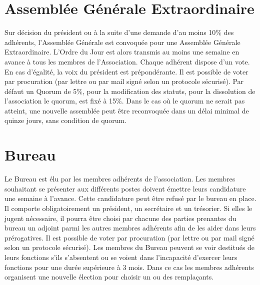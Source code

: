 \documentclass[12pt]{constitution}
\begin{document}
	\section{Assemblée Générale Extraordinaire}
	Sur décision du président ou à la suite d'une demande d'au moins 10\% des adhérents, l'Assemblée Générale est convoquée pour une Assemblée Générale Extraordinaire. L’Ordre du Jour est alors transmis au moins une semaine en avance à tous les membres de l’Association. Chaque adhérent dispose d’un vote. En cas d'égalité, la voix du président est prépondérante. Il est possible de voter par procuration (par lettre ou par mail signé selon un protocole sécurisé). Par défaut un Quorum de 5\%, pour la modification des statuts, pour la dissolution de l'association le quorum, est fixé à 15\%. Dans le cas où le quorum ne serait pas atteint, une nouvelle assemblée peut être reconvoquée dans un délai minimal de quinze jours, sans condition de quorum. 
	
	\section{Bureau}
	
	Le Bureau est élu par les membres adhérents de l'association. Les membres souhaitant se présenter aux différents postes doivent émettre leurs candidature une semaine à l'avance. Cette candidature peut être refusé par le bureau en place. Il comporte obligatoirement un président, un secrétaire et un trésorier. Si elles le jugent nécessaire, il pourra être choisi par chacune des parties prenantes du bureau un adjoint parmi les autres membres adhérents afin de les aider dans leurs prérogatives. Il est possible de voter par procuration (par lettre ou par mail signé selon un protocole sécurisé). Les membres du Bureau peuvent se voir destitués de leurs fonctions s'ils s'absentent ou se voient dans l'incapacité d'exercer leurs fonctions pour une durée supérieure à 3 mois. Dans ce cas les membres adhérents organisent une nouvelle élection pour choisir un ou des remplaçants.\\
	
\end{document}
